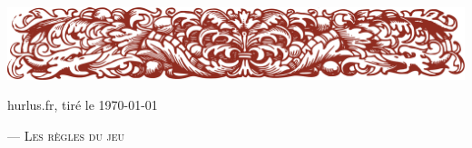 \documentclass[french,twoside]{book} %
\begin{document}
\pagestyle{fancy}
\thispagestyle{empty}


\begin{center}
\includegraphics[width=\columnwidth]{img/bandeau.pdf}\par
\bigskip
{\Large{}\bfseries{\elauthor}}\par
\smallskip
{\large\eldate}\par
\bigskip
{\Large\selectfont\sffamily\emph{\eltitle}}\par
\bigskip
{\Large{}}\par
\bigskip
\centerline{\small\color{rubric} {hurlus.fr, tiré le \today}}\par
{\hline\par}
\bigskip
\end{center}
\elabstract
\bigskip

\makeatletter{}\makeatother %

\ifdev %
\fontname\font — \textsc{Les règles du jeu}
\Blinddocument
\fi

\end{document}
